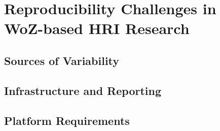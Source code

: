 \chapter{Reproducibility Challenges in WoZ-based HRI Research}
\label{ch:reproducibility}

\section{Sources of Variability}

\section{Infrastructure and Reporting}

\section{Platform Requirements}
